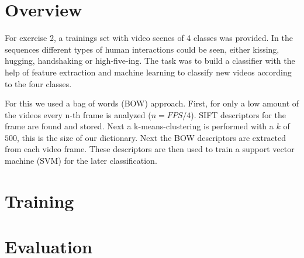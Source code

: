 \documentclass[]{scrartcl}
\begin{document}
\maketitle

\section{Overview}
For exercise 2, a trainings set with video scenes of 4 classes was provided. 
In the sequences different types of human interactions could be seen, either kissing, hugging, handshaking or high-five-ing. 
The task was to build a classifier with the help of feature extraction and machine learning to classify new videos according to the four classes.

For this we used a bag of words (BOW) approach. 
First, for only a low amount of the videos every n-th frame is analyzed ($n = FPS/4$). 
SIFT descriptors for the frame are found and stored. 
Next a k-means-clustering is performed with a $k$ of $500$, this is the size of our dictionary. 
Next the BOW descriptors are extracted from each video frame. 
These descriptors are then used to train a support vector machine (SVM) for the later classification.

\section{Training}	


\section{Evaluation}


\textbf{}
\end{document}
